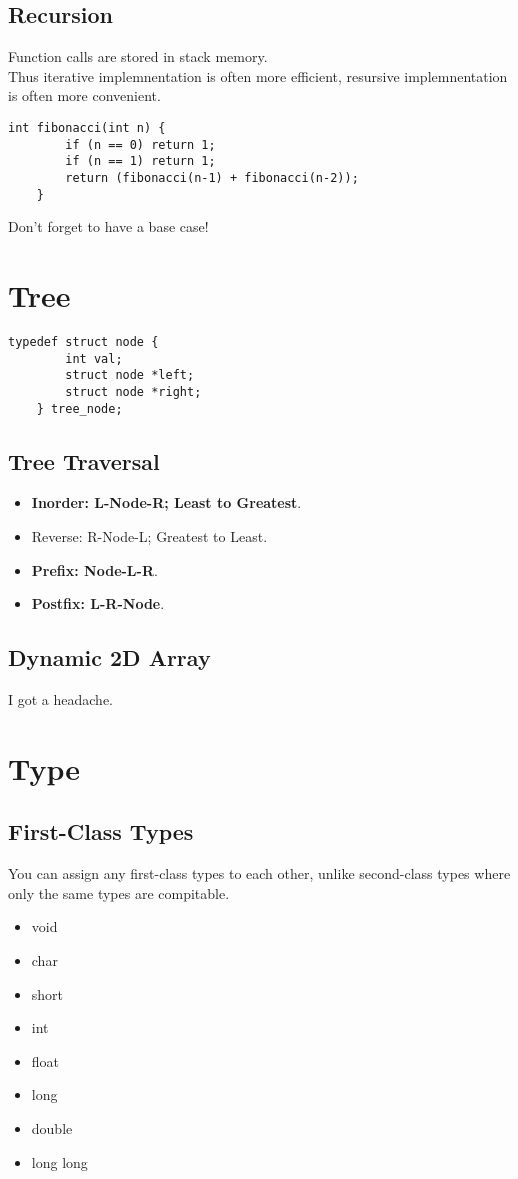 \documentclass{article}
\begin{document}
\subsection{Recursion}
Function calls are stored in stack memory.\\
Thus iterative implemnentation is often more efficient, resursive implemnentation is often more convenient.
\begin{lstlisting}[style=CStyle]
    int fibonacci(int n) {
        if (n == 0) return 1;
        if (n == 1) return 1;
        return (fibonacci(n-1) + fibonacci(n-2));
    }
\end{lstlisting}
Don't forget to have a base case!

\section{Tree}
\begin{lstlisting}[style=CStyle]
    typedef struct node {
        int val;
        struct node *left;
        struct node *right;
    } tree_node;
\end{lstlisting}

\subsection{Tree Traversal}
\begin{itemize}
    \item \textbf{Inorder: L-Node-R; Least to Greatest}.
    \item Reverse: R-Node-L; Greatest to Least.
    \item \textbf{Prefix: Node-L-R}.
    \item \textbf{Postfix: L-R-Node}.
\end{itemize}

\subsection{Dynamic 2D Array}
I got a headache.

\section{Type}

\subsection{First-Class Types}
You can assign any first-class types to each other, unlike second-class types where only the same types are compitable.
\begin{itemize}
    \item void
    \item char
    \item short
    \item int
    \item float
    \item long
    \item double
    \item long long
\end{itemize}
\end{document}
